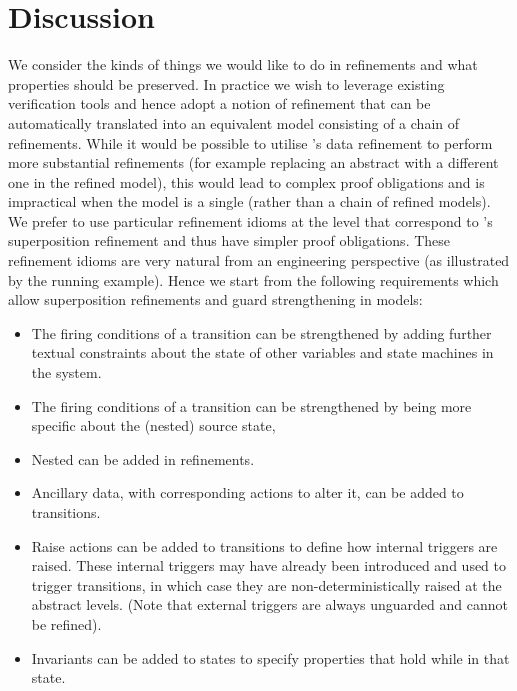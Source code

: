 
\section{Discussion}
\label{sec:discussion}
 
We consider the kinds of things we would like to do in \SCXML refinements and what properties should be preserved.
In practice we wish to leverage existing \EventB verification tools and hence adopt a notion of refinement that can be automatically translated into an equivalent \EventB model consisting of a chain of refinements.
While it would be possible to utilise \EventB's data refinement to perform more substantial \statechart refinements (for example replacing an abstract \statechart with a different one in the refined model), this would lead to complex proof obligations and is impractical when the \SCXML model is a single \Statechart (rather than a chain of refined models).
We prefer to use particular refinement idioms at the \statechart level that correspond to \EventB's superposition refinement and thus have simpler proof obligations. 
These refinement idioms are very natural from an engineering perspective (as illustrated by the running example).
Hence we start from the following requirements which allow superposition refinements and guard strengthening in \SCXML models:
\begin{itemize}
	\item The firing conditions of a transition can be strengthened by adding further textual constraints about the state of other variables and state machines in the system.
	\item The firing conditions of a transition can be strengthened by being more specific about the (nested) source state,
	\item Nested \Statecharts can be added in refinements.
	\item Ancillary data, with corresponding actions to alter it, can be added to transitions.
	\item Raise actions can be added to transitions to define how internal triggers are raised. These internal triggers may have already been introduced and used to trigger transitions, in which case they are non-deterministically raised at the abstract levels. (Note that external triggers are always unguarded and cannot be refined).
	\item Invariants can be added to states to specify properties that hold while in that state.
\end{itemize}

